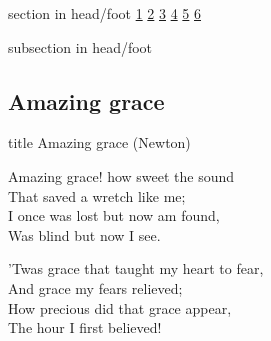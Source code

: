 \documentclass{beamer}
\begin{document}
{
{ 
 {
 \begin{beamercolorbox}[ht=4.5ex,dp=1.5ex,%
      leftskip=.3cm,rightskip=.3cm plus1fil]{section in head/foot}
 \fontsize{12}{25}\selectfont 
\hyperlink{Amazing grace[](Newton)1}{1}
\hyperlink{Amazing grace[](Newton)2}{2}
\hyperlink{Amazing grace[](Newton)3}{3}
\hyperlink{Amazing grace[](Newton)4}{4}
\hyperlink{Amazing grace[](Newton)5}{5}
\hyperlink{Amazing grace[](Newton)6}{6}
 
 \end{beamercolorbox}%
  \begin{beamercolorbox}[ht=2.5ex,dp=1.125ex,%
   leftskip=.3cm,rightskip=.3cm plus1fil]{subsection in head/foot}
   \insertauthor
 \end{beamercolorbox}%
 }
}
\subsection{ Amazing grace }

\hypertarget{Amazing grace[](Newton)}{}
\begin{frame}{}
 \vfill
  \centering
  \begin{beamercolorbox}[sep=8pt,center,shadow=true,rounded=true]{title}
    Amazing grace (Newton)    
  \end{beamercolorbox}
  \vfill
\end{frame}

\hypertarget{Amazing grace[](Newton)1}{}
\begin{frame}{}
\fontsize{ 18 }{ 23 }\selectfont

Amazing grace! how sweet the sound\\ 
That saved a wretch like me;\\ 
I once was lost but now am found,\\ 
Was blind but now I see. 

\end{frame}

\hypertarget{Amazing grace[](Newton)2}{}
\begin{frame}{}
\fontsize{ 18 }{ 23 }\selectfont

'Twas grace that taught my heart to fear,\\ 
And grace my fears relieved;\\ 
How precious did that grace appear,\\ 
The hour I first believed! 


\end{frame}}
\end{document}
